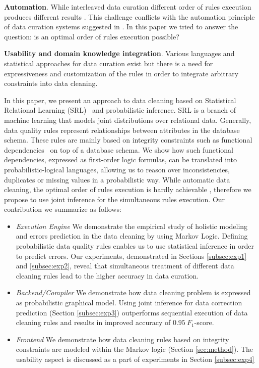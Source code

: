 \textbf{Automation}. While interleaved data curation different order of rules execution produces different results \cite{Dallachiesa:2013:NCD:2463676.2465327}. This challenge conflicts with the automation principle of data curation systems suggested in \cite{Stonebraker_datacuration}. In this paper we tried to answer the question: is an optimal order of rules execution possible? 

\textbf{Usability and domain knowledge integration}. Various languages and statistical approaches for data curation exist \cite{Dallachiesa:2013:NCD:2463676.2465327, chu2013holistic, llunaticVDLB2013b} but there is a need for expressiveness and customization of the rules in order to integrate arbitrary constraints into data cleaning.  

In this paper, we present an approach to data cleaning based on Statistical Relational Learning (SRL)~\cite{getoor2007introduction} and probabilistic inference. SRL is a branch of machine learning that models joint distributions over relational data. Generally, data quality rules represent relationships between attributes in the database schema. These rules are mainly based on integrity constraints such as functional dependencies~\cite{AbiteboulHV95, fan2012foundations} on top of a database schema. We show how such functional dependencies, expressed as first-order logic formulas, can be translated into probabilistic-logical languages, allowing us to reason over inconsistencies, duplicates or missing values in a probabilistic way. While automatic data cleaning, the optimal order of rules execution is hardly achievable \cite{Dallachiesa:2013:NCD:2463676.2465327}, therefore we propose to use joint inference for the simultaneous rules execution. Our contribution we summarize as follows:

\begin{itemize}
	\item \textit{Execution Engine} We demonstrate the empirical study of holistic modeling and errors prediction in the data cleaning by using Markov Logic. Defining probabilistic data quality rules enables us to use statistical inference in order to predict errors. Our experiments, demonstrated in Sections \ref{subsec:exp1} and \ref{subsec:exp2}, reveal that simultaneous treatment of different data cleaning rules lead to the higher accuracy in data curation.  
	\item \textit{Backend/Compiler} We demonstrate how data cleaning problem is expressed as probabilistic graphical model. Using joint inference for data correction prediction (Section \ref{subsec:exp3}) outperforms sequential execution of data cleaning rules and results in improved accuracy of $0.95~F_1$-score.  
	\item \textit{Frontend} We demonstrate how data cleaning rules based on integrity constraints are modeled within the Markov logic (Section \ref{sec:method}). The usability aspect is discussed as a part of experiments in Section \ref{subsec:exp4}
\end{itemize}




